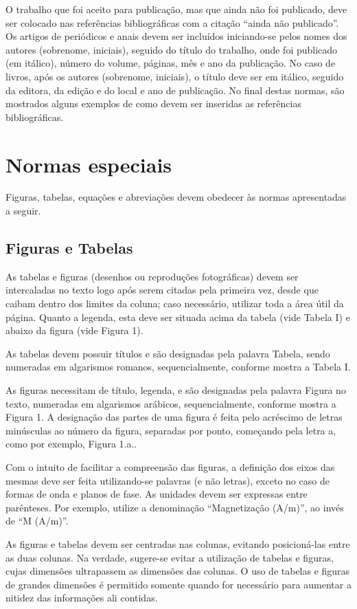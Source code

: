 \documentclass{ceel}
\begin{document}
\begin{multicols}{2}
\begin{enumerate}
O trabalho que foi aceito para publicação, mas que ainda não foi publicado, deve ser colocado nas referências bibliográficas com a citação “ainda não publicado”.
Os artigos de periódicos e anais devem ser incluídos iniciando-se pelos nomes dos autores (sobrenome, iniciais), seguido do título do trabalho, onde foi publicado (em itálico), número do volume, páginas, mês e ano da publicação. 
No caso de livros, após os autores (sobrenome, iniciais), o título deve ser em itálico, seguido da editora, da edição e do local e ano de publicação. 
No final destas normas, são mostrados alguns exemplos de como devem ser inseridas as referências bibliográficas.
\end{enumerate}
\section{Normas especiais}
Figuras, tabelas, equações e abreviações devem obedecer às normas apresentadas a seguir.
\subsection{Figuras e Tabelas}
As tabelas e figuras (desenhos ou reproduções fotográficas) devem ser intercaladas no texto logo após serem citadas pela primeira vez, desde que caibam dentro dos limites da coluna; caso necessário, utilizar toda a área útil da página. Quanto a legenda, esta deve ser situada acima da tabela (vide Tabela I) e abaixo da figura (vide Figura 1).

As tabelas devem possuir títulos e são designadas pela palavra Tabela, sendo numeradas em algarismos romanos, sequencialmente, conforme mostra a Tabela I.

As figuras necessitam de título, legenda, e são designadas pela palavra Figura no texto, numeradas em algarismos arábicos, sequencialmente, conforme mostra a Figura 1. A designação das partes de uma figura é feita pelo acréscimo de letras minúsculas ao número da figura, separadas por ponto, começando pela letra a, como por exemplo, Figura 1.a..

Com o intuito de facilitar a compreensão das figuras, a definição dos eixos das mesmas deve ser feita utilizando-se palavras (e não letras), exceto no caso de formas de onda e planos de fase. As unidades devem ser expressas entre parênteses. Por exemplo, utilize a denominação “Magnetização (A/m)”, ao invés de “M (A/m)”.

As figuras e tabelas devem ser centradas nas colunas, evitando posicioná-las entre as duas colunas. Na verdade, sugere-se evitar a utilização de tabelas e figuras, cujas dimensões ultrapassem as dimensões das colunas. O uso de tabelas e figuras de grandes dimensões é permitido somente quando for necessário para aumentar a nitidez das informações ali contidas.


\end{multicols}
\end{document}
